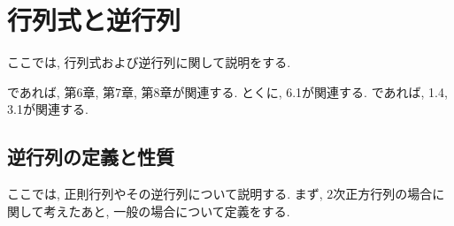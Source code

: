 \chapter{行列式と逆行列}
\label{chap:inverse}
ここでは,
行列式および逆行列に関して説明をする.



\cite{978-4-7806-0772-7}であれば,
第6章, 第7章, 第8章が関連する.
とくに, 6.1が関連する.
\cite{978-4-7806-0164-0}であれば,
1.4, 3.1が関連する.

\section{逆行列の定義と性質}
\label{sec:regular}
ここでは, 正則行列やその逆行列について説明する.
まず,
$2$次正方行列の場合に関して考えたあと,
一般の場合について定義をする.


